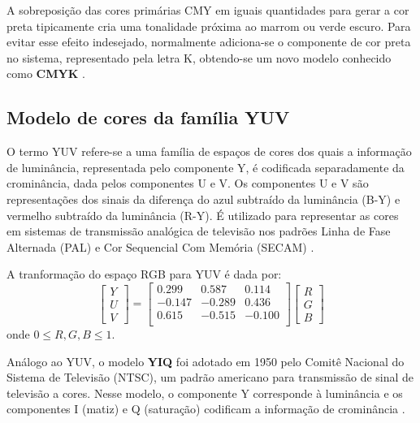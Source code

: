 A sobreposição das cores primárias CMY em iguais quantidades para gerar a cor preta tipicamente cria uma tonalidade próxima ao marrom ou verde escuro. Para evitar esse efeito indesejado, normalmente adiciona-se o componente de cor preta no sistema, representado pela letra K, obtendo-se um novo modelo conhecido como \textbf{CMYK} \citep{gonzalez:02}.

\subsection{Modelo de cores da família YUV}
\label{sec:modelo_cores_yuv}

O termo YUV refere-se a uma família de espaços de cores dos quais a informação de luminância, representada pelo componente Y, é codificada separadamente da crominância, dada pelos componentes U e V. Os componentes U e V são representações dos sinais da diferença do azul subtraído da luminância (B-Y) e vermelho subtraído da luminância (R-Y). É utilizado para representar as cores em sistemas de transmissão analógica de televisão nos padrões Linha de Fase Alternada (PAL) e Cor Sequencial Com Memória (SECAM) \citep{pedrini:08}.

A tranformação do espaço RGB para YUV é dada por:\\
\begin{equation}
  \begin{bmatrix}
    Y \\ U \\ V
  \end{bmatrix} = 
  \begin{bmatrix}
     0.299 &  0.587 &  0.114 \\
    -0.147 & -0.289 &  0.436 \\
     0.615 & -0.515 & -0.100 \\
  \end{bmatrix}
  \begin{bmatrix}
    R \\ G \\ B
  \end{bmatrix}
\end{equation}
onde $0 \leq R, G, B \leq 1$.

Análogo ao YUV, o modelo \textbf{YIQ} foi adotado em 1950 pelo Comitê Nacional do Sistema de Televisão (NTSC), um padrão americano para transmissão de sinal de televisão a cores. Nesse modelo, o componente Y corresponde à luminância e os componentes I (matiz) e Q (saturação) codificam a informação de crominância \citep{pedrini:08}.

